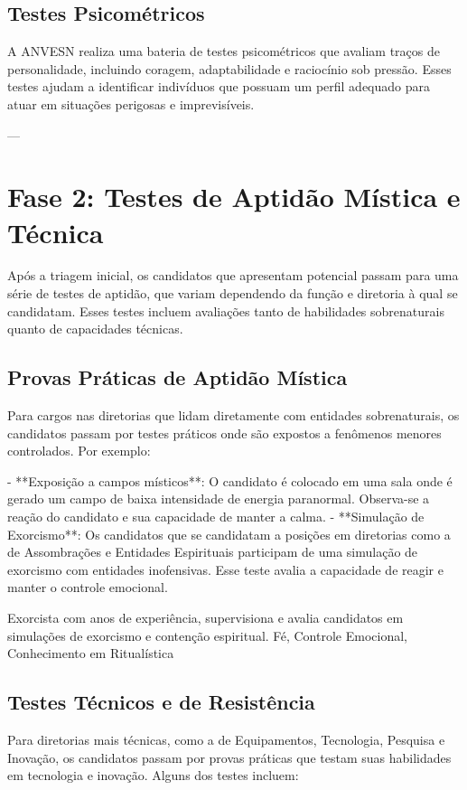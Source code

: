 \subsection{Testes Psicométricos}
A ANVESN realiza uma bateria de testes psicométricos que avaliam traços de personalidade, incluindo coragem, adaptabilidade e raciocínio sob pressão. Esses testes ajudam a identificar indivíduos que possuam um perfil adequado para atuar em situações perigosas e imprevisíveis.

---

\section{Fase 2: Testes de Aptidão Mística e Técnica}
Após a triagem inicial, os candidatos que apresentam potencial passam para uma série de testes de aptidão, que variam dependendo da função e diretoria à qual se candidatam. Esses testes incluem avaliações tanto de habilidades sobrenaturais quanto de capacidades técnicas.

\subsection{Provas Práticas de Aptidão Mística}
Para cargos nas diretorias que lidam diretamente com entidades sobrenaturais, os candidatos passam por testes práticos onde são expostos a fenômenos menores controlados. Por exemplo:

- **Exposição a campos místicos**: O candidato é colocado em uma sala onde é gerado um campo de baixa intensidade de energia paranormal. Observa-se a reação do candidato e sua capacidade de manter a calma.
- **Simulação de Exorcismo**: Os candidatos que se candidatam a posições em diretorias como a de Assombrações e Entidades Espirituais participam de uma simulação de exorcismo com entidades inofensivas. Esse teste avalia a capacidade de reagir e manter o controle emocional.

{Exorcista com anos de experiência, supervisiona e avalia candidatos em simulações de exorcismo e contenção espiritual.}
{Fé, Controle Emocional, Conhecimento em Ritualística}

\subsection{Testes Técnicos e de Resistência}
Para diretorias mais técnicas, como a de Equipamentos, Tecnologia, Pesquisa e Inovação, os candidatos passam por provas práticas que testam suas habilidades em tecnologia e inovação. Alguns dos testes incluem:

